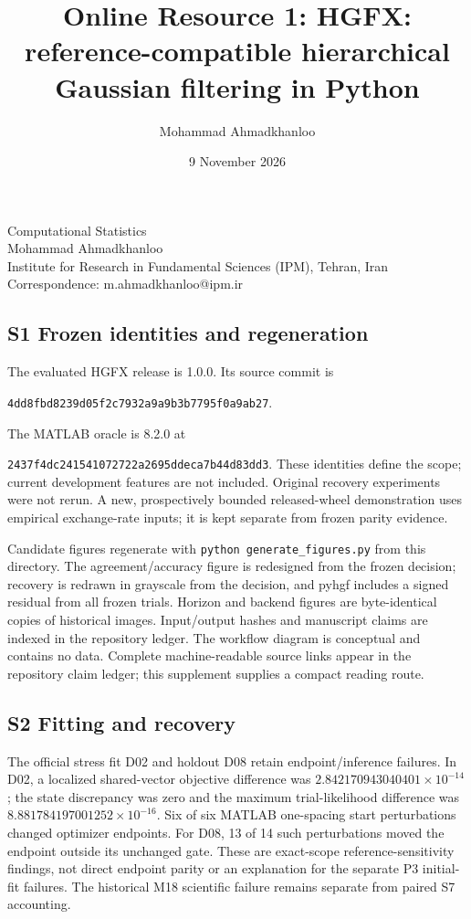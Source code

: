 \documentclass[
  11pt,
]{article}
\title{Online Resource 1: HGFX: reference-compatible hierarchical Gaussian filtering in Python}
\author{Mohammad Ahmadkhanloo}
\date{9 November 2026}
\begin{document}
\maketitle

Computational Statistics\\
Mohammad Ahmadkhanloo\\
Institute for Research in Fundamental Sciences (IPM), Tehran, Iran\\
Correspondence: m.ahmadkhanloo@ipm.ir



\subsection{S1 Frozen identities and
regeneration}\label{s1-frozen-identities-and-regeneration}

The evaluated HGFX release is 1.0.0. Its source commit is

\texttt{4dd8fbd8239d05f2c7932a9a9b3b7795f0a9ab27}.

The MATLAB oracle is 8.2.0 at

\texttt{2437f4dc241541072722a2695ddeca7b44d83dd3}. These identities
define the scope; current development features are not included.
Original recovery experiments were not rerun. A new, prospectively
bounded released-wheel demonstration uses empirical exchange-rate
inputs; it is kept separate from frozen parity evidence.

Candidate figures regenerate with \texttt{python\ generate\_figures.py}
from this directory. The agreement/accuracy figure is redesigned from
the frozen decision; recovery is redrawn in grayscale from the decision,
and pyhgf includes a signed residual from all frozen trials. Horizon and
backend figures are byte-identical copies of historical images.
Input/output hashes and manuscript claims are indexed in the repository
ledger. The workflow diagram is conceptual and contains no data.
Complete machine-readable source links appear in the repository claim
ledger; this supplement supplies a compact reading route.

\subsection{S2 Fitting and recovery}\label{s2-fitting-and-recovery}

The official stress fit D02 and holdout D08 retain endpoint/inference
failures. In D02, a localized shared-vector objective difference was
\(2.842170943040401\times10^{-14}\); the state discrepancy was zero and
the maximum trial-likelihood difference was
\(8.881784197001252\times10^{-16}\). Six of six MATLAB one-spacing start
perturbations changed optimizer endpoints. For D08, 13 of 14 such
perturbations moved the endpoint outside its unchanged gate. These are
exact-scope reference-sensitivity findings, not direct endpoint parity
or an explanation for the separate P3 initial-fit failures. The
historical M18 scientific failure remains separate from paired S7
accounting.
\end{document}
